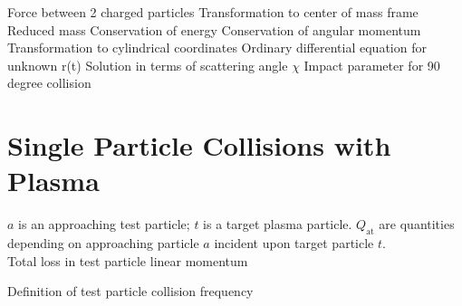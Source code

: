 \noindent
Force between 2 charged particles
\noindent
Transformation to center of mass frame 
\noindent
Reduced mass 
Conservation of energy 
Conservation of angular momentum 
Transformation to cylindrical coordinates 
Ordinary differential equation for unknown r(t) 
Solution in terms of scattering angle $\chi$ 
Impact parameter for 90 degree collision 

\section{Single Particle Collisions with Plasma}
$a$ is an approaching test particle; $t$ is a target plasma particle.
$Q_\mathrm{at}$ are quantities depending on approaching particle $a$
incident upon target particle $t$.\\

\noindent
Total loss in test particle linear momentum 

\noindent
Definition of test particle collision frequency 

